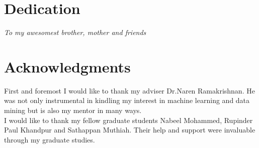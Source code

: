 \documentclass[12pt]{report}
\begin{document}
\chapter*{Dedication}
\vspace*{\fill}
\begin{center}
\Large\textit{To my awesomest brother, mother and friends}
\end{center}
\vspace{\fill}

\chapter*{Acknowledgments}
\vspace*{\fill}
\Large{First and foremost I would like to thank my adviser Dr.Naren Ramakrishnan. He was not only instrumental in kindling my interest in machine learning and data mining but is also my mentor in many ways.\\
I would like to thank my fellow graduate students Nabeel Mohammed, Rupinder Paul Khandpur and Sathappan Muthiah. Their help and support were invaluable through my graduate studies.
}
\vspace{\fill}

\tableofcontents
\pagebreak

\listoffigures
\pagebreak

\listoftables
\pagebreak

\pagestyle{myheadings}









%
%

%

\end{document}
